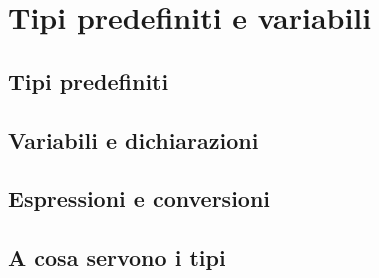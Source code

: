 \chapter{Tipi predefiniti e variabili}
\section{Tipi predefiniti}
\section{Variabili e dichiarazioni}
\section{Espressioni e conversioni}
\section{A cosa servono i tipi}



\newpage